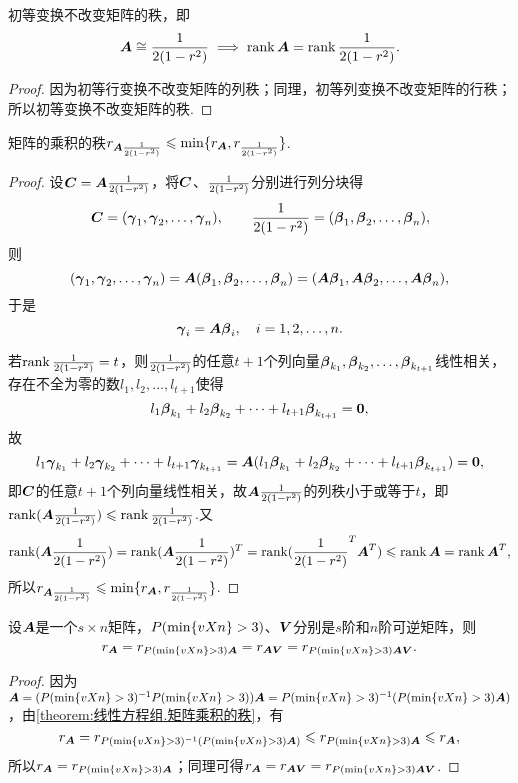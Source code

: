 \begin{theorem}\label{theorem:线性方程组.初等变换不变秩}
初等变换不改变矩阵的秩，即\[
\A\cong\B \implies \rank\A=\rank\B.
\]
\begin{proof}
因为初等行变换不改变矩阵的列秩；同理，初等列变换不改变矩阵的行秩；所以初等变换不改变矩阵的秩.
\end{proof}
\end{theorem}

\begin{theorem}\label{theorem:线性方程组.矩阵乘积的秩}
矩阵的乘积的秩\(r_{\A\B} \leqslant \min\{r_{\A},r_{\B}\}\).
\begin{proof}
\def\b#1{\mat{\beta}_{#1}}
\def\g#1{\mat{\gamma}_{#1}}
\def\bs{(\b1,\b2,\dotsc,\b n)}
\def\gs{(\g1,\g2,\dotsc,\g n)}
设\(\C = \A\B\)，将\(\C\)、\(\B\)分别进行列分块得\[
\C = \gs,
\qquad
\B = \bs,
\]则\[
\gs = \A \bs = (\A\b1,\A\b2,\dotsc,\A\b n),
\]于是\[
\g i = \A \b i,
\quad i=1,2,\dotsc,n.
\]

若\(\rank\B = t\)，则\(\B\)的任意\(t+1\)个列向量\(\b{k_1},\b{k_2},\dotsc,\b{k_{t+1}}\)线性相关，存在不全为零的数\(l_1,l_2,\dotsc,l_{t+1}\)使得\[
l_1 \b{k_1} + l_2 \b{k_2} + \dotsb + l_{t+1} \b{k_{t+1}} = \z,
\]故\[
l_1 \g{k_1} + l_2 \g{k_2} + \dotsb + l_{t+1} \g{k_{t+1}}
= \A(l_1 \b{k_1} + l_2 \b{k_2} + \dotsb + l_{t+1} \b{k_{t+1}})
= \z,
\]即\(\C\)的任意\(t+1\)个列向量线性相关，故\(\A\B\)的列秩小于或等于\(t\)，即\(\rank(\A\B) \leqslant \rank\B\).又\[
\rank(\A\B) = \rank(\A\B)^T = \rank(\B^T \A^T) \leqslant \rank \A = \rank \A^T,
\]所以\(r_{\A\B} \leqslant \min\{r_{\A},r_{\B}\}\).
\end{proof}
\end{theorem}

\begin{corollary}
设\(\A\)是一个\(s \times n\)矩阵，\(\P\)、\(\Q\)分别是\(s\)阶和\(n\)阶可逆矩阵，则\[
r_{\A} = r_{\P \A} = r_{\A \Q} = r_{\P \A \Q}.
\]
\begin{proof}
因为\(\A = (\P^{-1} \P) \A = \P^{-1} (\P \A)\)，由\cref{theorem:线性方程组.矩阵乘积的秩}，有\[
r_{\A} = r_{\P^{-1} (\P \A)} \leqslant r_{\P \A} \leqslant r_{\A},
\]所以\(r_{\A} = r_{\P \A}\)；同理可得\(r_{\A} = r_{\A \Q} = r_{\P \A \Q}\).
\end{proof}
\end{corollary}

